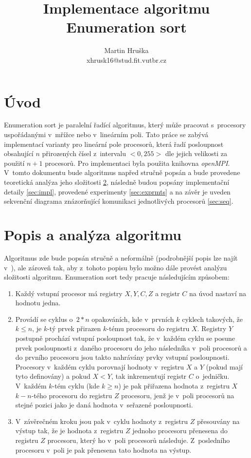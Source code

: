 \documentclass[a4paper, 12pt]{article}
\title{Implementace algoritmu Enumeration sort}
\author{Martin Hruška\\xhrusk16@stud.fit.vutbr.cz}
\date{}
\begin{document}
\maketitle

\section{Úvod}
\label{sec:intro}
Enumeration sort je paralelní řadící algoritmus, který může pracovat s~procesory uspořádanými v~mřížce nebo v~lineárním poli.
Tato práce se zabývá implementací varianty pro lineární pole procesorů, která řadí
posloupnost obsahující $n$ přirozených čísel z~intervalu $<0,255>$ dle jejich velikosti za použití $n+1$ procesorů.
Pro implementaci byla použita knihovna \emph{openMPI}.
V~tomto dokumentu bude algoritmus napřed
stručně popsán a bude provedene teoretická analýza jeho složitosti \ref{sec:analysis},
následně budou popsány implementační detaily \ref{sec:impl},
provedené experimenty \ref{sec:exprmts}
a na závěr je uveden sekvenční diagrama znázorňující komunikaci jednotlivých procesorů \ref{sec:seq}.

\section{Popis a analýza algoritmu}
\label{sec:analysis}
Algoritmus zde bude popsán stručně a neformálně (podrobnější popis lze najít v~\cite{prl:pred}),
ale zároveň tak, aby z~tohoto popisu bylo možno dále provést analýzu složitosti algoritmu.
Enumeration sort tedy pracuje následujícím způsobem:
\begin{enumerate}
\item Každý vstupní procesor má registry $X, Y, C, Z$ a registr $C$ na úvod nastaví
na hodnotu jedna.
\item Provádí se cyklus o~$2*n$ opakováních, kde v~prvních $k$ cyklech takových, že $k\leq n$,
je $k$-tý prvek přirazen $k$-tému procesoru do registru $X$.
Registry $Y$ postupně prochází vstupní posloupnost tak, že v~každém cyklu se posune prvek posloupnosti z~daného procesoru
do jeho následníka v~poli procesorů a do prvního procesoru jsou takto nahrávány prvky vstupní posloupnosti.
Procesory v~každém cyklu porovnají hodnoty v~registru $X$ a $Y$ (pokud mají tyto definovány)
a pokud $X < Y$, tak inkrementují registr $C$ o~jedničku.
V~každém $k$-tém cyklu (kde $k \geq n$) je pak přiřazena hodnota z~registru $X$ $k-n$-tého procesoru do registru $Z$ procesoru,
jenž je v~poli procesorů na stejné pozici jako je daná hodnota v~seřazené posloupnosti.
\item V~závěrečném kroku jsou pak v~cyklu hodnoty z~registru $Z$ přesouvány na výstup tak, že je hodnota
z~registru $Z$ jednoho procesoru přenesena do registru $Z$ procesoru, který ho v~poli procesorů následuje.
Z~posledního procesoru v~poli je pak přenesena tato hodnota na výstup.
\end{enumerate}
\end{document}
